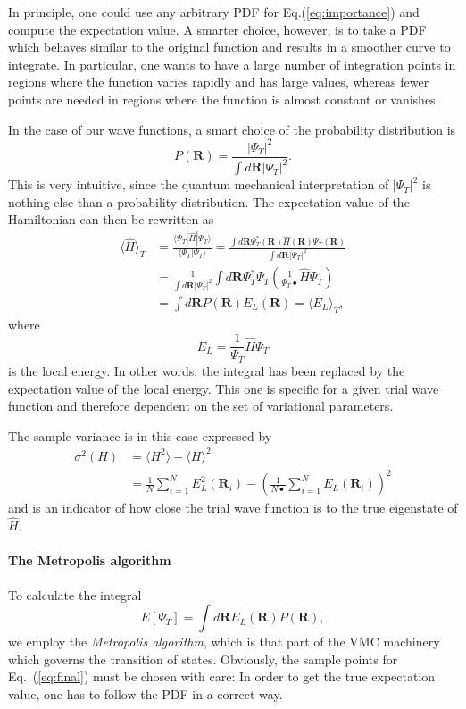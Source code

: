 In principle, one could use any arbitrary PDF for Eq.(\ref{eq:importance}) and compute the expectation value.  A smarter choice, however, is to take a PDF which behaves similar to the original function and results in a smoother curve to integrate. In particular, one wants to have a large number of integration points in regions where the function varies rapidly and has large values, whereas fewer points are needed in regions where the function is almost constant or vanishes.


In the case of our wave functions, a smart choice of the probability distribution is
\[
P(\mathbf{R}) = \frac{|\Psi_T|^2}{\int d\mathbf{R}|\Psi_T|^2 }.
\]
This is very intuitive, since the quantum mechanical interpretation of $|\Psi_T|^2$ is nothing else than a probability distribution.
The expectation value of the Hamiltonian can then be rewritten as
\begin{align*}
\langle \hat{H}\rangle_T &=  \frac{\langle\Psi_T|\hat{H}|\Psi_T\rangle}{\langle\Psi_T|\Psi_T\rangle}  = \frac{\int d\mathbf{R}\Psi^{\ast}_T(\mathbf{R})\hat H(\mathbf{R})\Psi_T(\mathbf{R})}
        {\int d\mathbf{R}|\Psi_T|^2 }\\
&= \frac{1}{\int d\mathbf{R}|\Psi_T|^2 }\int d\mathbf{R}\Psi_T^*\Psi_T\left(\frac{1}{\Psi_T•}\hat{H}\Psi_T\right)\\
&= \int d\mathbf{R} P(\mathbf{R})E_L(\mathbf{R}) = \langle{E_L}\rangle_T,
\end{align*}
where
\[
E_L = \frac{1}{\Psi_T}\hat{H} \Psi_T
\]
is the local energy. In other words, the integral has been replaced by  the expectation value of the local energy. This one is specific for a given trial wave function and therefore dependent on the set of variational parameters.

The sample variance is in this case expressed by
\begin{align*}
\sigma^ 2(H) &= \langle H^ 2 \rangle - \langle H \rangle^ 2\\
&= \frac{1}{N}\sum_{i = 1}^ N E_L^ 2\left(\mathbf{R}_i\right) - \left(\frac{1}{N•}\sum_{i = 1}^ N E_L\left(\mathbf{R}_i\right)\right)^ 2
\end{align*}
and is an indicator of how close the trial wave function is to the true eigenstate of $\hat{H}$.

\paragraph{The Metropolis algorithm}
To calculate the  integral
\begin{equation}
\label{eq:final}
E\left[\Psi_T\right] = \int d\mathbf{R}E_L(\mathbf{R}) P(\mathbf{R}),
\end{equation}
we employ the \textit{Metropolis algorithm}, which is that part of the VMC machinery which governs the transition of states. Obviously, the sample points for Eq.~(\ref{eq:final}) must be chosen with care: In order to get the true expectation value, one has to follow the PDF in a correct way.

